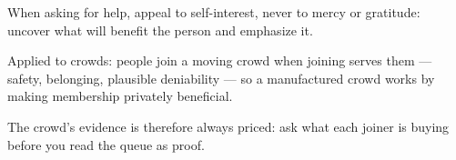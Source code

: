 

\begin{distilled}
  \item When asking for help, appeal to self-interest, never to mercy or gratitude: uncover what will benefit the person and emphasize it.
  \item Applied to crowds: people join a moving crowd when joining serves them --- safety, belonging, plausible deniability --- so a manufactured crowd works by making membership privately beneficial.
  \item The crowd's evidence is therefore always priced: ask what each joiner is buying before you read the queue as proof.
\end{distilled}
